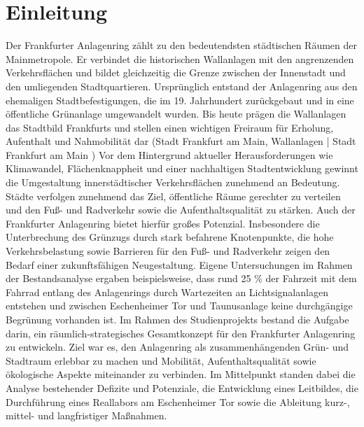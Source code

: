 \documentclass[a4paper,12pt]{article}
\begin{document}


\clearpage

\tableofcontents

\clearpage

\renewcommand{\listfigurename}{Abbildungsverzeichnis}
\listoffigures

\renewcommand{\listtablename}{Tabellenverzeichnis}
\listoftables

\clearpage

\section{Einleitung}

Der Frankfurter Anlagenring zählt zu den bedeutendsten städtischen Räumen der Mainmetropole. Er verbindet die historischen Wallanlagen mit den angrenzenden Verkehrsflächen und bildet gleichzeitig die Grenze zwischen der Innenstadt und den umliegenden Stadtquartieren. Ursprünglich entstand der Anlagenring aus den ehemaligen Stadtbefestigungen, die im 19. Jahrhundert zurückgebaut und in eine öffentliche Grünanlage umgewandelt wurden. Bis heute prägen die Wallanlagen das Stadtbild Frankfurts und stellen einen wichtigen Freiraum für Erholung, Aufenthalt und Nahmobilität dar (Stadt Frankfurt am Main, Wallanlagen | Stadt Frankfurt am Main )
Vor dem Hintergrund aktueller Herausforderungen wie Klimawandel, Flächenknappheit und einer nachhaltigen Stadtentwicklung gewinnt die Umgestaltung innerstädtischer Verkehrsflächen zunehmend an Bedeutung. Städte verfolgen zunehmend das Ziel, öffentliche Räume gerechter zu verteilen und den Fuß- und Radverkehr sowie die Aufenthaltsqualität zu stärken. Auch der Frankfurter Anlagenring bietet hierfür großes Potenzial. Insbesondere die Unterbrechung des Grünzugs durch stark befahrene Knotenpunkte, die hohe Verkehrsbelastung sowie Barrieren für den Fuß- und Radverkehr zeigen den Bedarf einer zukunftsfähigen Neugestaltung. Eigene Untersuchungen im Rahmen der Bestandsanalyse ergaben beispielsweise, dass rund 25 \% der Fahrzeit mit dem Fahrrad entlang des Anlagenrings durch Wartezeiten an Lichtsignalanlagen entstehen und zwischen Eschenheimer Tor und Taunusanlage keine durchgängige Begrünung vorhanden ist.
Im Rahmen des Studienprojekts bestand die Aufgabe darin, ein räumlich-strategisches Gesamtkonzept für den Frankfurter Anlagenring zu entwickeln. Ziel war es, den Anlagenring als zusammenhängenden Grün- und Stadtraum erlebbar zu machen und Mobilität, Aufenthaltsqualität sowie ökologische Aspekte miteinander zu verbinden. Im Mittelpunkt standen dabei die Analyse bestehender Defizite und Potenziale, die Entwicklung eines Leitbildes, die Durchführung eines Reallabors am Eschenheimer Tor sowie die Ableitung kurz-, mittel- und langfristiger Maßnahmen. 
\end{document}
